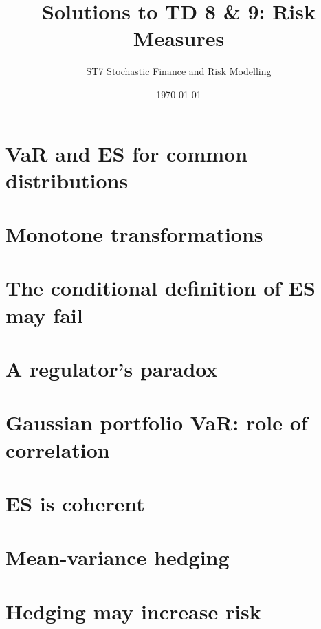 \documentclass{article}
\begin{document}
\title{Solutions to TD 8 \& 9: Risk Measures}
\author{ST7 Stochastic Finance and Risk Modelling}
\date{\today}

\maketitle

\tableofcontents
\newpage


\section{VaR and ES for common distributions}

\newpage

\section{Monotone transformations}

\newpage

\section{The conditional definition of ES may fail}

\newpage

\section{A regulator's paradox}

\newpage

\section{Gaussian portfolio VaR: role of correlation}

\newpage

\section{ES is coherent}

\newpage

\section{Mean-variance hedging}

\newpage

\section{Hedging may increase risk}

\end{document}
